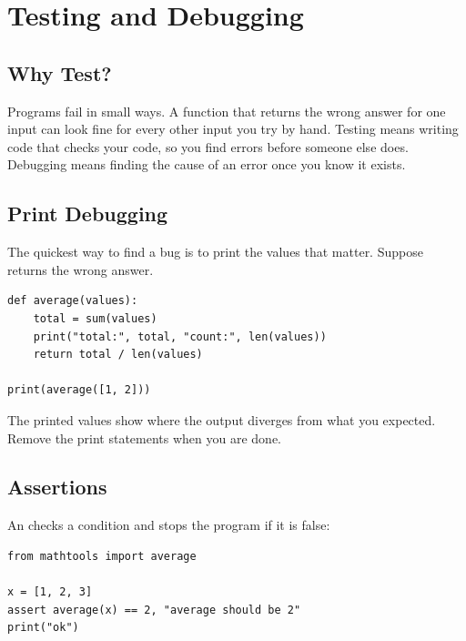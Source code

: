 \chapter{Testing and Debugging}

\section{Why Test?}
Programs fail in small ways. A function that returns the wrong answer for one
input can look fine for every other input you try by hand. Testing means writing
code that checks your code, so you find errors before someone else does.
Debugging means finding the cause of an error once you know it exists.

\section{Print Debugging}
\begin{Worked}
\begin{Problem}
The quickest way to find a bug is to print the values that matter. Suppose
 returns the wrong answer.
\end{Problem}
\begin{Solution}
\begin{verbatim}
def average(values):
    total = sum(values)
    print("total:", total, "count:", len(values))
    return total / len(values)

print(average([1, 2]))
\end{verbatim}

The printed values show where the output diverges from what you expected.
Remove the print statements when you are done.
\end{Solution}
\end{Worked}

\section{Assertions}
An  checks a condition and stops the program if it is false:

\begin{verbatim}
from mathtools import average

x = [1, 2, 3]
assert average(x) == 2, "average should be 2"
print("ok")
\end{verbatim}

